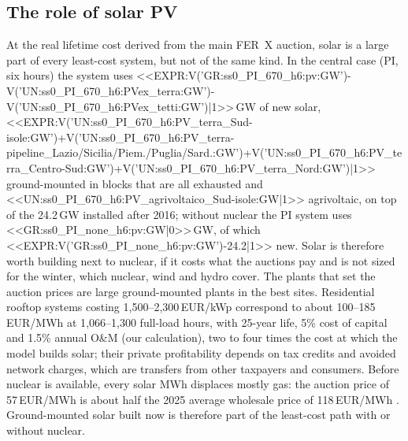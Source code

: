 \subsection{The role of solar PV}
At the real lifetime cost derived from the main FER~X auction, solar is a large part of every least-cost system, but not of the same kind. In the central case (PI, six hours) the system uses <<EXPR:V('GR:ss0_PI_670_h6:pv:GW')-V('UN:ss0_PI_670_h6:PVex_terra:GW')-V('UN:ss0_PI_670_h6:PVex_tetti:GW')|1>>\,GW of new solar, <<EXPR:V('UN:ss0_PI_670_h6:PV_terra_Sud-isole:GW')+V('UN:ss0_PI_670_h6:PV_terra-pipeline_Lazio/Sicilia/Piem./Puglia/Sard.:GW')+V('UN:ss0_PI_670_h6:PV_terra_Centro-Sud:GW')+V('UN:ss0_PI_670_h6:PV_terra_Nord:GW')|1>> ground-mounted in blocks that are all exhausted and <<UN:ss0_PI_670_h6:PV_agrivoltaico_Sud-isole:GW|1>> agrivoltaic, on top of the 24.2\,GW installed after 2016; without nuclear the PI system uses <<GR:ss0_PI_none_h6:pv:GW|0>>\,GW, of which <<EXPR:V('GR:ss0_PI_none_h6:pv:GW')-24.2|1>> new. Solar is therefore worth building next to nuclear, if it costs what the auctions pay and is not sized for the winter, which nuclear, wind and hydro cover. The plants that set the auction prices are large ground-mounted plants in the best sites. Residential rooftop systems costing 1{,}500--2{,}300\,EUR/kWp \citep{Rooftop2026} correspond to about 100--185\,EUR/MWh at 1{,}066--1{,}300 full-load hours, with 25-year life, 5\% cost of capital and 1.5\% annual O\&M (our calculation), two to four times the cost at which the model builds solar; their private profitability depends on tax credits and avoided network charges, which are transfers from other taxpayers and consumers. Before nuclear is available, every solar MWh displaces mostly gas: the auction price of 57\,EUR/MWh is about half the 2025 average wholesale price of 118\,EUR/MWh \citep{PUN2025}. Ground-mounted solar built now is therefore part of the least-cost path with or without nuclear.

